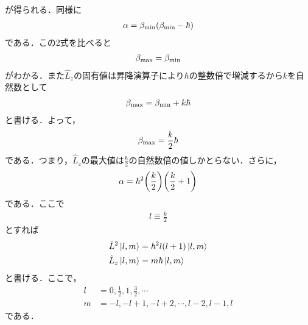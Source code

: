 \documentclass{report}
\begin{document}
が得られる．同様に
\begin{align}
  \alpha = \beta_{\mathrm{min}}(\beta_{\mathrm{min}} - \hbar)
\end{align}
である．この2式を比べると
\begin{align}
  \beta_{\mathrm{max}} = \beta_{\mathrm{min}}
\end{align}
がわかる．また$\hat{L}_z$の固有値は昇降演算子により$\hbar$の整数倍で増減するから$k$を自然数として
\begin{align}
  \beta_{\mathrm{max}} = \beta_{\mathrm{min}} + k\hbar
\end{align}
と書ける．よって，
\begin{align}
  \beta_{\mathrm{max}} = \frac{k}{2}\hbar
\end{align}
である．つまり，$\hat{L}_z$の最大値は$\frac{\hbar}{2}$の自然数倍の値しかとらない．さらに，
\begin{align}
  \alpha = \hbar^2\qty(\frac{k}{2})\qty(\frac{k}{2} + 1)
\end{align}
である．ここで
\begin{align}
  l \equiv \frac{k}{2}
\end{align}
とすれば
\begin{align}
  \hat{L}^2\ket{l,m} &= \hbar^2 l(l+1)\ket{l,m} \label{abs-of-l}\\
  \hat{L}_z\ket{l,m} &= m\hbar\ket{l,m} \label{magnitude-of-lz}
\end{align}
と書ける．ここで，
\begin{align}
  l &= 0,\frac{1}{2},1,\frac{3}{2},\cdots\\
  m &= -l,-l+1,-l+2,\cdots,l-2,l-1,l
\end{align}
である．
\end{document}
